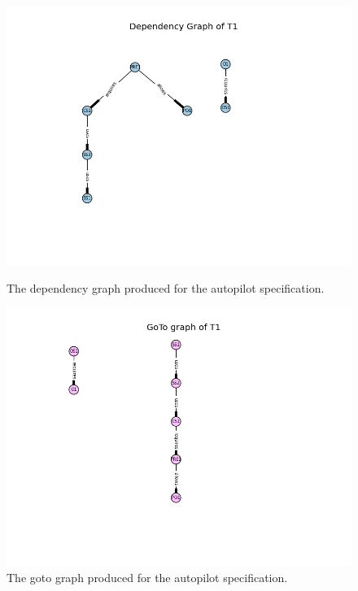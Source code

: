 \begin{figure}[H]
\centering
\begin{minipage}{0.45\textwidth}
\centering
\includegraphics[scale=0.5]{examples/semiform/25a.png}
\vspace{-0.18in}
\caption{The dependency graph produced for the autopilot specification. \label{fig:autodepgraph}}
\vspace{-0.2in}
\end{minipage}\hfill
\begin{minipage}{0.43\textwidth}
\centering
\includegraphics[scale=0.5]{examples/semiform/25b.png}
\vspace{-0.2in}
\caption{The goto graph produced for the autopilot specification. \label{fig:autogotograph}}
\vspace{-0.2in}
\end{minipage}
\end{figure}

